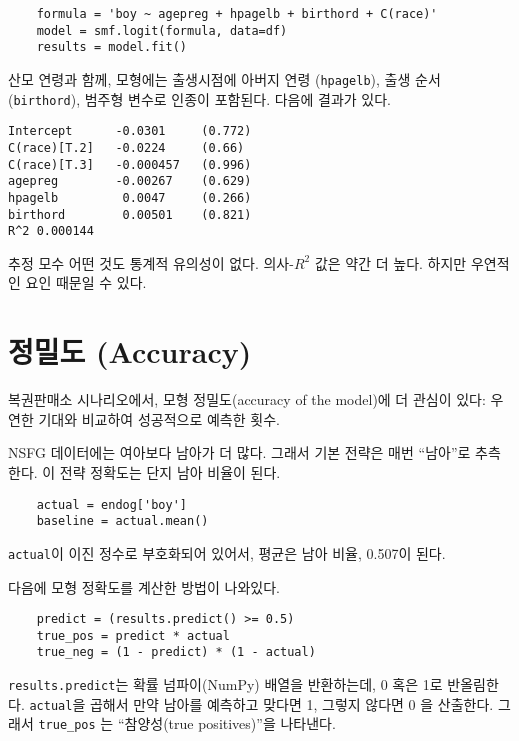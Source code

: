 \begin{verbatim}
    formula = 'boy ~ agepreg + hpagelb + birthord + C(race)'
    model = smf.logit(formula, data=df)
    results = model.fit()
\end{verbatim}

산모 연령과 함께, 모형에는 출생시점에 아버지 연령 ({\tt hpagelb}), 
출생 순서 ({\tt birthord}), 범주형 변수로 인종이 포함된다.
다음에 결과가 있다.

\begin{verbatim}
Intercept      -0.0301     (0.772)
C(race)[T.2]   -0.0224     (0.66)
C(race)[T.3]   -0.000457   (0.996)
agepreg        -0.00267    (0.629)
hpagelb         0.0047     (0.266)
birthord        0.00501    (0.821)
R^2 0.000144
\end{verbatim}

추정 모수 어떤 것도 통계적 유의성이 없다. 의사-$R^2$ 값은 약간 더 높다. 하지만 우연적인 요인 때문일 수 있다.


\section{정밀도 (Accuracy)}
\label{accuracy}

복권판매소 시나리오에서, 모형 정밀도(accuracy of the model)에 더 관심이 있다: 우연한 기대와 비교하여 성공적으로 예측한 횟수.


NSFG 데이터에는 여아보다 남아가 더 많다. 그래서 기본 전략은 매번 ``남아''로 추측한다. 이 전략 정확도는 단지 남아 비율이 된다.

\begin{verbatim}
    actual = endog['boy']
    baseline = actual.mean()
\end{verbatim}

{\tt actual}이 이진 정수로 부호화되어 있어서, 평균은 남아 비율, 0.507이 된다.

다음에 모형 정확도를 계산한 방법이 나와있다.

\begin{verbatim}
    predict = (results.predict() >= 0.5)
    true_pos = predict * actual
    true_neg = (1 - predict) * (1 - actual)
\end{verbatim}

{\tt results.predict}는 확률 넘파이(NumPy) 배열을 반환하는데, 0 혹은 1로 반올림한다. {\tt actual}을 곱해서 만약 남아를 예측하고 맞다면 1, 그렇지 않다면 0 을 산출한다. 그래서 \verb"true_pos" 는 ``참양성(true positives)''을 나타낸다.

